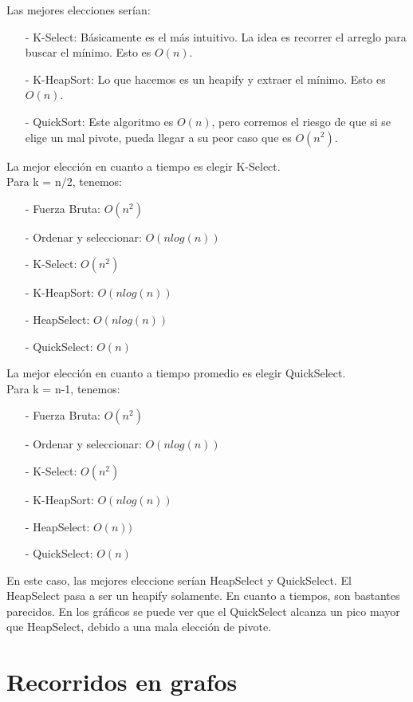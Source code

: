 Las mejores elecciones serían:
\begin{itemize}
\item[-] K-Select: Básicamente es el más intuitivo. La idea es recorrer el arreglo para buscar el mínimo. Esto es $O(n)$.
\item[-] K-HeapSort: Lo que hacemos es un heapify y extraer el mínimo. Esto es $O(n)$.
\item[-] QuickSort: Este algoritmo es $O(n)$, pero corremos el riesgo de que si se elige un mal pivote, pueda llegar a su peor caso que es $O(n^2)$.
\end{itemize}
La mejor elección en cuanto a tiempo es elegir K-Select.
\\

Para k = n/2, tenemos:
\begin{itemize}
\item[-] Fuerza Bruta: $O(n^2)$
\item[-] Ordenar y seleccionar: $O(n log(n))$
\item[-] K-Select: $O(n^2)$
\item[-] K-HeapSort: $O(n log(n))$
\item[-] HeapSelect: $O(n log(n))$
\item[-] QuickSelect: $O(n)$
\end{itemize}

La mejor elección en cuanto a tiempo promedio es elegir QuickSelect.
\\


Para k = n-1, tenemos:
\begin{itemize}
\item[-] Fuerza Bruta: $O(n^2)$
\item[-] Ordenar y seleccionar: $O(n log(n))$
\item[-] K-Select: $O(n^2)$
\item[-] K-HeapSort: $O(n log(n))$
\item[-] HeapSelect: $O(n))$
\item[-] QuickSelect: $O(n)$
\end{itemize}

En este caso, las mejores eleccione serían HeapSelect y QuickSelect. El HeapSelect pasa a ser un heapify solamente. En cuanto a tiempos, son bastantes parecidos. En los gráficos se puede ver que el QuickSelect alcanza un pico mayor que HeapSelect, debido a una mala elección de pivote.

\newpage

\section{Recorridos en grafos}

